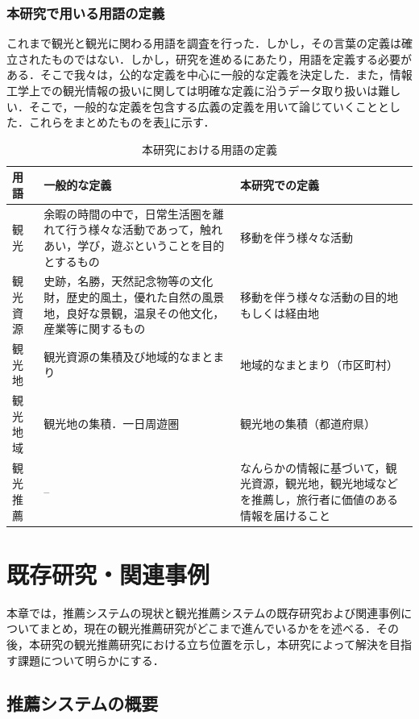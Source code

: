 \documentclass{jsarticle}
\begin{document}
\subsubsection{本研究で用いる用語の定義}

これまで観光と観光に関わる用語を調査を行った．しかし，その言葉の定義は確立されたものではない．しかし，研究を進めるにあたり，用語を定義する必要がある．そこで我々は，公的な定義を中心に一般的な定義を決定した．また，情報工学上での観光情報の扱いに関しては明確な定義に沿うデータ取り扱いは難しい．そこで，一般的な定義を包含する広義の定義を用いて論じていくこととした．これらをまとめたものを表\ref{define_of_tourism}に示す．

\begin{table}[!h]
\small
\caption{本研究における用語の定義}
\begin{center}
\begin{tabular}{lp{}p{}}
\label{define_of_tourism}
用語 & 一般的な定義 & 本研究での定義 \\ \hline
観光        & 余暇の時間の中で，日常生活圏を離れて行う様々な活動であって，触れあい，学び，遊ぶということを目的とするもの        & 移動を伴う様々な活動 \\
観光資源    & 史跡，名勝，天然記念物等の文化財，歴史的風土，優れた自然の風景地，良好な景観，温泉その他文化，産業等に関するもの  & 移動を伴う様々な活動の目的地もしくは経由地 \\
観光地      & 観光資源の集積及び地域的なまとまり    & 地域的なまとまり（市区町村） \\
観光地域    & 観光地の集積．一日周遊圏              & 観光地の集積（都道府県） \\
観光推薦    & --                                    & なんらかの情報に基づいて，観光資源，観光地，観光地域などを推薦し，旅行者に価値のある情報を届けること
\end{tabular}
\end{center}
\end{table}

\section{既存研究・関連事例}

本章では，推薦システムの現状と観光推薦システムの既存研究および関連事例についてまとめ，現在の観光推薦研究がどこまで進んでいるかをを述べる．その後，本研究の観光推薦研究における立ち位置を示し，本研究によって解決を目指す課題について明らかにする．

\subsection{推薦システムの概要}
\end{document}
